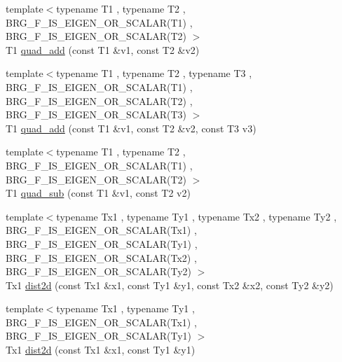 \begin{DoxyCompactItemize}
\item 
{\footnotesize template$<$typename T1 , typename T2 , B\+R\+G\+\_\+\+F\+\_\+\+I\+S\+\_\+\+E\+I\+G\+E\+N\+\_\+\+O\+R\+\_\+\+S\+C\+A\+L\+A\+R(\+T1) , B\+R\+G\+\_\+\+F\+\_\+\+I\+S\+\_\+\+E\+I\+G\+E\+N\+\_\+\+O\+R\+\_\+\+S\+C\+A\+L\+A\+R(\+T2) $>$ }\\T1 \hyperlink{namespaceIceBRG_a2c4958952bda89f2403890a62c523d87}{quad\+\_\+add} (const T1 \&v1, const T2 \&v2)
\item 
{\footnotesize template$<$typename T1 , typename T2 , typename T3 , B\+R\+G\+\_\+\+F\+\_\+\+I\+S\+\_\+\+E\+I\+G\+E\+N\+\_\+\+O\+R\+\_\+\+S\+C\+A\+L\+A\+R(\+T1) , B\+R\+G\+\_\+\+F\+\_\+\+I\+S\+\_\+\+E\+I\+G\+E\+N\+\_\+\+O\+R\+\_\+\+S\+C\+A\+L\+A\+R(\+T2) , B\+R\+G\+\_\+\+F\+\_\+\+I\+S\+\_\+\+E\+I\+G\+E\+N\+\_\+\+O\+R\+\_\+\+S\+C\+A\+L\+A\+R(\+T3) $>$ }\\T1 \hyperlink{namespaceIceBRG_afa30f99c3dcd8fe6d6adaf6a79174cd2}{quad\+\_\+add} (const T1 \&v1, const T2 \&v2, const T3 v3)
\item 
{\footnotesize template$<$typename T1 , typename T2 , B\+R\+G\+\_\+\+F\+\_\+\+I\+S\+\_\+\+E\+I\+G\+E\+N\+\_\+\+O\+R\+\_\+\+S\+C\+A\+L\+A\+R(\+T1) , B\+R\+G\+\_\+\+F\+\_\+\+I\+S\+\_\+\+E\+I\+G\+E\+N\+\_\+\+O\+R\+\_\+\+S\+C\+A\+L\+A\+R(\+T2) $>$ }\\T1 \hyperlink{namespaceIceBRG_a0ed96352aa8c6745c1ddc132c774e437}{quad\+\_\+sub} (const T1 \&v1, const T2 v2)
\item 
{\footnotesize template$<$typename Tx1 , typename Ty1 , typename Tx2 , typename Ty2 , B\+R\+G\+\_\+\+F\+\_\+\+I\+S\+\_\+\+E\+I\+G\+E\+N\+\_\+\+O\+R\+\_\+\+S\+C\+A\+L\+A\+R(\+Tx1) , B\+R\+G\+\_\+\+F\+\_\+\+I\+S\+\_\+\+E\+I\+G\+E\+N\+\_\+\+O\+R\+\_\+\+S\+C\+A\+L\+A\+R(\+Ty1) , B\+R\+G\+\_\+\+F\+\_\+\+I\+S\+\_\+\+E\+I\+G\+E\+N\+\_\+\+O\+R\+\_\+\+S\+C\+A\+L\+A\+R(\+Tx2) , B\+R\+G\+\_\+\+F\+\_\+\+I\+S\+\_\+\+E\+I\+G\+E\+N\+\_\+\+O\+R\+\_\+\+S\+C\+A\+L\+A\+R(\+Ty2) $>$ }\\Tx1 \hyperlink{namespaceIceBRG_a1b4a86edf11877125aecd31b976282dc}{dist2d} (const Tx1 \&x1, const Ty1 \&y1, const Tx2 \&x2, const Ty2 \&y2)
\item 
{\footnotesize template$<$typename Tx1 , typename Ty1 , B\+R\+G\+\_\+\+F\+\_\+\+I\+S\+\_\+\+E\+I\+G\+E\+N\+\_\+\+O\+R\+\_\+\+S\+C\+A\+L\+A\+R(\+Tx1) , B\+R\+G\+\_\+\+F\+\_\+\+I\+S\+\_\+\+E\+I\+G\+E\+N\+\_\+\+O\+R\+\_\+\+S\+C\+A\+L\+A\+R(\+Ty1) $>$ }\\Tx1 \hyperlink{namespaceIceBRG_ac6b3d187a888e42c79d2dfd1a02ec7d7}{dist2d} (const Tx1 \&x1, const Ty1 \&y1)
\item 

\end{DoxyCompactItemize}
